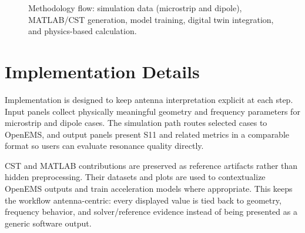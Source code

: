 \documentclass[12pt,a4paper]{article}
\begin{document}
\begin{figure}[H]
\centering
{}
\caption{Methodology flow: simulation data (microstrip and dipole), MATLAB/CST generation, model training, digital twin integration, and physics-based calculation.}
\end{figure}

\section{Implementation Details}
Implementation is designed to keep antenna interpretation explicit at each step. Input panels collect physically meaningful geometry and frequency parameters for microstrip and dipole cases. The simulation path routes selected cases to OpenEMS, and output panels present S11 and related metrics in a comparable format so users can evaluate resonance quality directly.

CST and MATLAB contributions are preserved as reference artifacts rather than hidden preprocessing. Their datasets and plots are used to contextualize OpenEMS outputs and train acceleration models where appropriate. This keeps the workflow antenna-centric: every displayed value is tied back to geometry, frequency behavior, and solver/reference evidence instead of being presented as a generic software output.
\end{document}
